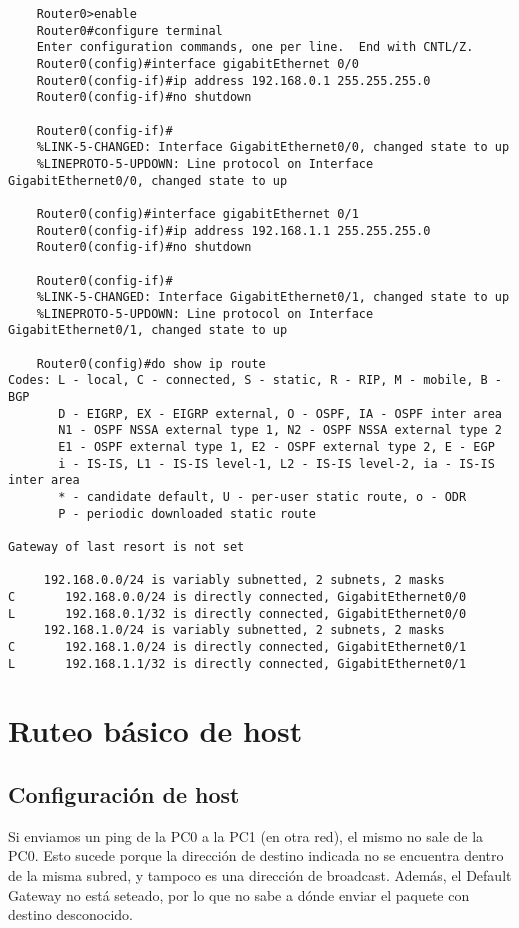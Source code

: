 \documentclass{article}
\begin{document}
\begin{verbatim}
    Router0>enable
    Router0#configure terminal
    Enter configuration commands, one per line.  End with CNTL/Z.
    Router0(config)#interface gigabitEthernet 0/0
    Router0(config-if)#ip address 192.168.0.1 255.255.255.0
    Router0(config-if)#no shutdown

    Router0(config-if)#
    %LINK-5-CHANGED: Interface GigabitEthernet0/0, changed state to up
    %LINEPROTO-5-UPDOWN: Line protocol on Interface GigabitEthernet0/0, changed state to up

    Router0(config)#interface gigabitEthernet 0/1
    Router0(config-if)#ip address 192.168.1.1 255.255.255.0
    Router0(config-if)#no shutdown

    Router0(config-if)#
    %LINK-5-CHANGED: Interface GigabitEthernet0/1, changed state to up
    %LINEPROTO-5-UPDOWN: Line protocol on Interface GigabitEthernet0/1, changed state to up

    Router0(config)#do show ip route
Codes: L - local, C - connected, S - static, R - RIP, M - mobile, B - BGP
       D - EIGRP, EX - EIGRP external, O - OSPF, IA - OSPF inter area
       N1 - OSPF NSSA external type 1, N2 - OSPF NSSA external type 2
       E1 - OSPF external type 1, E2 - OSPF external type 2, E - EGP
       i - IS-IS, L1 - IS-IS level-1, L2 - IS-IS level-2, ia - IS-IS inter area
       * - candidate default, U - per-user static route, o - ODR
       P - periodic downloaded static route

Gateway of last resort is not set

     192.168.0.0/24 is variably subnetted, 2 subnets, 2 masks
C       192.168.0.0/24 is directly connected, GigabitEthernet0/0
L       192.168.0.1/32 is directly connected, GigabitEthernet0/0
     192.168.1.0/24 is variably subnetted, 2 subnets, 2 masks
C       192.168.1.0/24 is directly connected, GigabitEthernet0/1
L       192.168.1.1/32 is directly connected, GigabitEthernet0/1

\end{verbatim}

\newpage
\section{Ruteo b\'asico de host}
\subsection{Configuraci\'on de host}

Si enviamos un ping de la PC0 a la PC1 (en otra red), el mismo no sale de la PC0. Esto sucede porque la direcci\'on de destino indicada no se encuentra dentro de la misma subred, y tampoco es una direcci\'on de broadcast. Adem\'as, el Default Gateway no est\'a seteado, por lo que no sabe a d\'onde enviar el paquete con destino desconocido. \\
\end{document}
